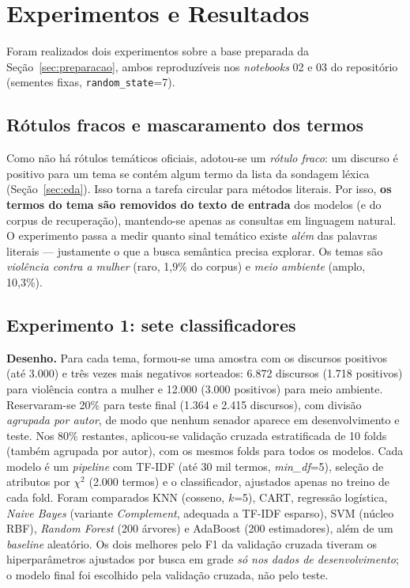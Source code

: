 \documentclass[12pt]{article}
\begin{document}
\section{Experimentos e Resultados}\label{sec:experimentos}

Foram realizados dois experimentos sobre a base preparada da Seção~\ref{sec:preparacao}, ambos
reproduzíveis nos \textit{notebooks} 02 e 03 do repositório (sementes fixas, \texttt{random\_state}=7).

\subsection{Rótulos fracos e mascaramento dos termos}

Como não há rótulos temáticos oficiais, adotou-se um \emph{rótulo fraco}: um discurso é positivo
para um tema se contém algum termo da lista da sondagem léxica (Seção~\ref{sec:eda}). Isso torna
a tarefa circular para métodos literais. Por isso, \textbf{os termos do tema são removidos do
texto de entrada} dos modelos (e do corpus de recuperação), mantendo-se apenas as consultas em
linguagem natural. O experimento passa a medir quanto sinal temático existe \emph{além} das
palavras literais --- justamente o que a busca semântica precisa explorar. Os temas são
\emph{violência contra a mulher} (raro, 1,9\% do corpus) e \emph{meio ambiente} (amplo, 10,3\%).

\subsection{Experimento 1: sete classificadores}

\textbf{Desenho.} Para cada tema, formou-se uma amostra com os discursos positivos (até 3.000) e
três vezes mais negativos sorteados: 6.872 discursos (1.718 positivos) para violência contra a
mulher e 12.000 (3.000 positivos) para meio ambiente. Reservaram-se 20\% para teste final (1.364 e
2.415 discursos), com divisão \emph{agrupada por autor}, de modo que nenhum senador aparece em
desenvolvimento e teste. Nos 80\% restantes, aplicou-se validação cruzada estratificada de 10
folds (também agrupada por autor), com os mesmos folds para todos os modelos. Cada modelo é um
\textit{pipeline} com TF-IDF (até 30 mil termos, \textit{min\_df}=5), seleção de atributos por
$\chi^2$ (2.000 termos) e o classificador, ajustados apenas no treino de cada fold. Foram
comparados KNN (cosseno, $k$=5), CART, regressão logística, \textit{Naive Bayes} (variante
\textit{Complement}, adequada a TF-IDF esparso), SVM (núcleo RBF), \textit{Random Forest} (200
árvores) e AdaBoost (200 estimadores), além de um \textit{baseline} aleatório. Os dois melhores
pelo F1 da validação cruzada tiveram os hiperparâmetros ajustados por busca em grade \emph{só nos
dados de desenvolvimento}; o modelo final foi escolhido pela validação cruzada, não pelo teste.
\end{document}
